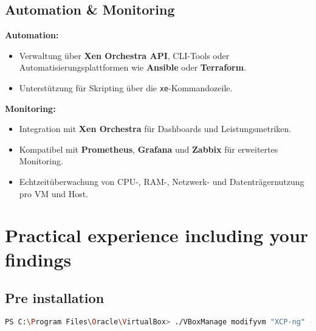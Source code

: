\documentclass[BMR,Seminar,ngerman,IEEE]{twbook}
\begin{document}
\section{Automation \& Monitoring}
\textbf{Automation:}
\begin{itemize}[noitemsep]
  \item Verwaltung über \textbf{Xen Orchestra API}, CLI-Tools oder Automatisierungsplattformen wie \textbf{Ansible} oder \textbf{Terraform}.
  \item Unterstützung für Skripting über die \texttt{xe}-Kommandozeile.
\end{itemize}

\textbf{Monitoring:}
\begin{itemize}[noitemsep]
  \item Integration mit \textbf{Xen Orchestra} für Dashboards und Leistungsmetriken.
  \item Kompatibel mit \textbf{Prometheus}, \textbf{Grafana} und \textbf{Zabbix} für erweitertes Monitoring.
  \item Echtzeitüberwachung von CPU-, RAM-, Netzwerk- und Datenträgernutzung pro VM und Host.
\end{itemize}

\chapter{Practical experience including your findings}

\section{Pre installation}
\label{sec:pre_installation}

\begin{lstlisting}[language=bash,caption={Befehlt, dass der Hypervisor in einer VirtualBox laufen kann}]
PS C:\Program Files\Oracle\VirtualBox> ./VBoxManage modifyvm "XCP-ng" --nested-hw-virt on
\end{lstlisting}
\end{document}

